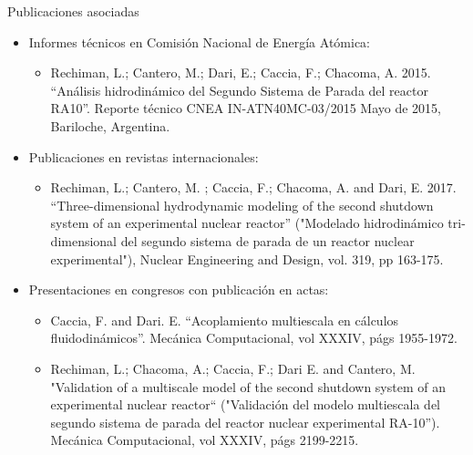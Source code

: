 \documentclass[12pt,screen,twoside,pagebackref]{ibtesis}
\begin{document}
%
%

\begin{biblio}

\end{biblio}


\begin{postliminary}

\begin{seccion}{Publicaciones asociadas}
\begin{itemize}

\item Informes técnicos en Comisión Nacional de Energía Atómica:
\begin{itemize}
\item Rechiman, L.; Cantero, M.; Dari, E.; Caccia, F.; Chacoma, A. 2015. “Análisis hidrodinámico del Segundo Sistema de Parada del reactor RA10”. Reporte técnico CNEA IN-ATN40MC-03/2015 Mayo de 2015, Bariloche, Argentina.
\end{itemize}

\item Publicaciones en revistas internacionales:
\begin{itemize}
\item Rechiman, L.; Cantero, M. ; Caccia, F.; Chacoma, A. and Dari, E. 2017. “Three-dimensional hydrodynamic modeling of the second shutdown system of an experimental nuclear reactor” ("Modelado hidrodinámico tri-dimensional del segundo sistema de parada de un reactor nuclear experimental"), Nuclear Engineering and Design, vol. 319, pp 163-175.
\end{itemize}

\item Presentaciones en congresos con publicación en actas:
\begin{itemize}
\item Caccia, F. and Dari. E. “Acoplamiento multiescala en cálculos fluidodinámicos”. Mecánica Computacional, vol XXXIV, págs 1955-1972.

\item Rechiman, L.; Chacoma, A.; Caccia, F.; Dari E. and Cantero, M. "Validation of a multiscale model of the second shutdown system of an experimental nuclear reactor“ ("Validación del modelo multiescala del segundo sistema de parada del reactor nuclear experimental RA-10”). Mecánica Computacional, vol XXXIV, págs 2199-2215.
\end{itemize}

\end{itemize}
\end{seccion}


\end{postliminary}
\end{document}
